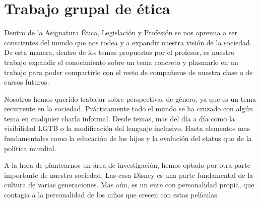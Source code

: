\newpage
\chapter*{Trabajo grupal de ética}
Dentro de la Asignatura Ética, Legislación y Profesión se nos apremia a ser conscientes del mundo que nos rodea y a expandir nuestra visión de la sociedad. De esta manera, dentro de los temas propuestos por el profesor, es nuestro trabajo expandir el conocimiento sobre un tema concreto y plasmarlo en un trabajo para poder compartirlo con el resto de compañeros de nuestra clase o de cursos futuros. 

Nosotros hemos querido trabajar sobre perspectivas de género, ya que es un tema recurrente en la sociedad. Prácticamente todo el mundo se ha cruzado con algún tema en cualquier charla informal. Desde temas, mas del día a día como la visibilidad LGTB o la modificación del lenguaje inclusivo. Hasta elementos mas fundamentales como la educación de los hijos y la evolución del status quo de la política mundial.

A la hora de plantearnos un área de investigación, hemos optado por otra parte importante de nuestra sociedad. Las casa Disney es una parte fundamental de la cultura de varias generaciones. Mas aún, es un ente con personalidad propia, que contagia a la personalidad de los niños que crecen con estas películas.